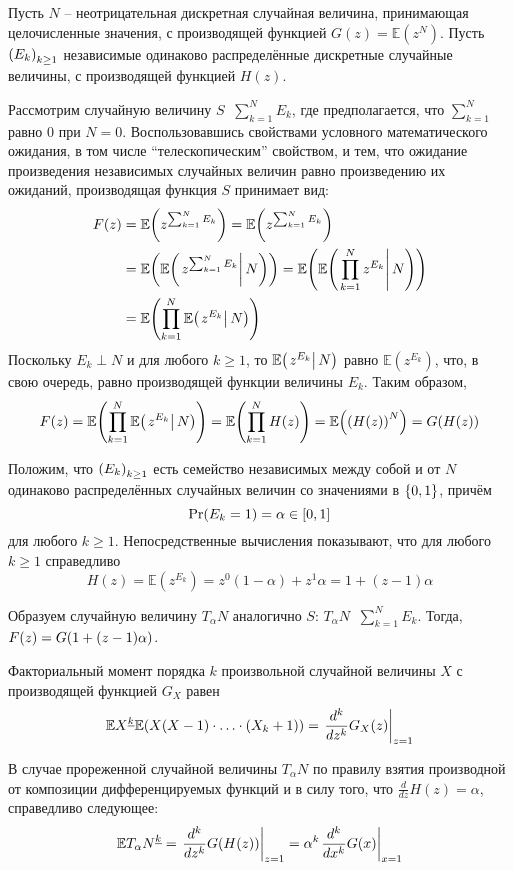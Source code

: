 \documentclass[a4paper]{article}
\let\originalleft\left
\let\originalright\right
\renewcommand{\left}{\mathopen{}\mathclose\bgroup\originalleft}
\renewcommand{\right}{\aftergroup\egroup\originalright}
\newcommand{\obj}[1]{{\left\{ #1 \right \}}}
\newcommand{\clo}[1]{{\left [ #1 \right ]}}
\newcommand{\brac}[1]{{\left ( #1 \right )}}
\newcommand{\induc}[1]{{\left . #1 \right \vert}}
\newcommand{\Ex}[0]{{\mathbb{E}}}
\newcommand{\defn}{{\mathop{\overset{\Delta}{=}}\nolimits}}
\begin{document}
Пусть $N$ -- неотрицательная дискретная случайная величина, принимающая
целочисленные значения, с производящей функцией $G(z) = \Ex(z^N)$.
Пусть $\brac{E_k}_{k\geq 1}$ независимые одинаково распределённые дискретные
случайные величины, с производящей функцией $H(z)$.

Рассмотрим случайную величину $S \defn \sum_{k=1}^N E_k$, где предполагается,
что $\sum_{k=1}^N$ равно $0$ при $N=0$. Воспользовавшись свойствами условного
математического ожидания, в том числе ``телескопическим'' свойством, и тем,
что ожидание произведения независимых случайных величин равно произведению
их ожиданий, производящая функция $S$ принимает вид:
\begin{align*}
	F(z) &= \Ex\brac{ z^{\sum_{k=1}^N E_k} }
	= \Ex\brac{ z^{\sum_{k=1}^N E_k} } \\
	& = \Ex\brac{ \Ex\brac{\induc{z^{\sum_{k=1}^N E_k} }\,N} }
	= \Ex\brac{ \Ex\brac{\induc{\prod_{k=1}^N z^{E_k} }\,N} } \\
	& = \Ex\brac{ \prod_{k=1}^N \Ex\brac{\induc{z^{E_k} }\,N} }
\end{align*}
Поскольку $E_k\perp N$ и для любого $k\geq 1$, то $\Ex\brac{\induc{z^{E_k} }\,N}$
равно $\Ex(z^{E_k})$, что, в свою очередь, равно производящей функции величины
$E_k$.
Таким образом,
\[F(z) = \Ex\brac{ \prod_{k=1}^N \Ex\brac{\induc{z^{E_k} }\,N} }
= \Ex\brac{ \prod_{k=1}^N H(z) } = \Ex\brac{ \brac{H(z)}^N } = G\brac{H(z)}\]

Положим, что $\brac{E_k}_{k\geq 1}$ есть семейство независимых между собой и
от $N$ одинаково распределённых случайных величин со значениями в $\obj{0,1}$,
причём \[\Pr(E_k = 1) = \alpha \in \clo{0,1}\] для любого $k\geq 1$.
Непосредственные вычисления показывают, что для любого $k\geq1$ справедливо
\[H(z) = \Ex(z^{E_k}) = z^0 (1-\alpha) + z^1 \alpha = 1 + (z-1) \alpha\]

Образуем случайную величину $T_\alpha N$ аналогично $S$:
$T_\alpha N \defn \sum_{k=1}^N E_k$.
Тогда, $F(z) = G\brac{1 + (z-1) \alpha}$.

Факториальный момент порядка $k$ произвольной случайной величины $X$ с
производящей функцией $G_X$ равен
\[ \Ex X^{\underline{k}} \Ex\brac{X(X-1)\cdot\ldots\cdot(X_k+1)}
	= \induc{\frac{d^k}{dz^k} G_X(z) }_{z=1}\]

В случае прореженной случайной величины $T_\alpha N$ по правилу взятия
производной от композиции дифференцируемых функций и в силу того, что
$\frac{d}{dz}H(z) = \alpha$, справедливо следующее: 
\[\Ex {T_\alpha N}^{\underline{k}} = \induc{\frac{d^k}{dz^k} G\brac{H(z)} }_{z=1}
= \alpha^k\induc{\frac{d^k}{dx^k} G(x) }_{x=1}\]
\end{document}
